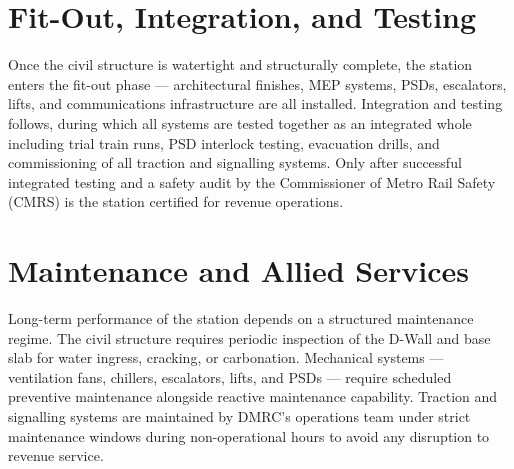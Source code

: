 \section{Fit-Out, Integration, and Testing}
\par\noindent
Once the civil structure is watertight and structurally complete, the station enters the fit-out phase --- architectural finishes, MEP systems, PSDs, escalators, lifts, and communications infrastructure are all installed. Integration and testing follows, during which all systems are tested together as an integrated whole including trial train runs, PSD interlock testing, evacuation drills, and commissioning of all traction and signalling systems. Only after successful integrated testing and a safety audit by the Commissioner of Metro Rail Safety (CMRS) is the station certified for revenue operations.

\section{Maintenance and Allied Services}
\par\noindent
Long-term performance of the station depends on a structured maintenance regime. The civil structure requires periodic inspection of the D-Wall and base slab for water ingress, cracking, or carbonation. Mechanical systems --- ventilation fans, chillers, escalators, lifts, and PSDs --- require scheduled preventive maintenance alongside reactive maintenance capability. Traction and signalling systems are maintained by DMRC's operations team under strict maintenance windows during non-operational hours to avoid any disruption to revenue service.